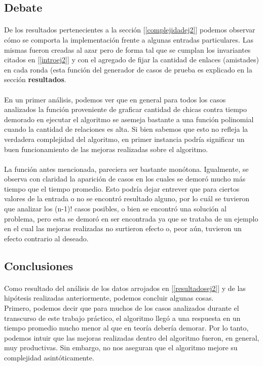 \subsection{Debate}
\paragraph{}
De los resultados pertenecientes a la sección [\ref{complejidadej2}] podemos observar cómo se comporta la implementación frente a algunas entradas particulares. Las mismas fueron creadas al azar pero de forma tal que se cumplan los invariantes citados en [\ref{introej2}] y con el agregado de fijar la cantidad de enlaces (amistades) en cada ronda (esta función del generador de casos de prueba es explicado en la sección \textbf{resultados}.


\paragraph{}
En un primer análisis, podemos ver que en general para todos los casos analizados la función proveniente de graficar cantidad de chicas contra tiempo demorado en ejecutar el algoritmo se asemeja bastante a una función polinomial cuando la cantidad de relaciones es alta. Si bien sabemos que esto no refleja la verdadera complejidad del algoritmo, en primer instancia podría significar un buen funcionamiento de las mejoras realizadas sobre el algoritmo.

\paragraph{}
La función antes mencionada, pareciera ser bastante monótona. Igualmente, se observa con claridad la aparición de casos en los cuales se demoró mucho más tiempo que el tiempo promedio. Esto podría dejar entrever que para ciertos valores de la entrada o no se encontró resultado alguno, por lo cuál se tuvieron que analizar los (n-1)! casos posibles, o bien se encontró una solución al problema, pero esta se demoró en ser encontrada ya que se trataba de un ejemplo en el cual las mejoras realizadas no surtieron efecto o, peor aún, tuvieron un efecto contrario al deseado.


\subsection{Conclusiones}

\paragraph{}
Como resultado del análisis de los datos arrojados en [\ref{resultadosej2}] y de las hipótesis realizadas anteriormente, podemos concluir algunas cosas.\\
Primero, podemos decir que para muchos de los casos analizados durante el transcurso de este trabajo práctico, el algoritmo llegó a una respuesta en un tiempo promedio mucho menor al que en teoría debería demorar. Por lo tanto, podemos intuir que las mejoras realizadas dentro del algoritmo fueron, en general, muy productivas. Sin embargo, no nos aseguran que el algoritmo mejore su complejidad asintóticamente.

